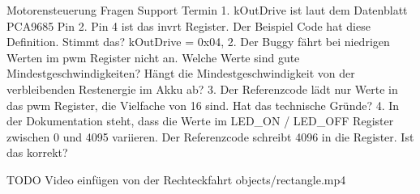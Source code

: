 \documentclass[12pt,twoside]{report}
\begin{document}
\begin{section}{Motorensteuerung}
Fragen Support Termin
1. kOutDrive ist laut dem Datenblatt PCA9685 Pin 2. Pin 4 ist das invrt Register. Der
Beispiel Code hat diese Definition. Stimmt das?
kOutDrive    = 0x04,
2. Der Buggy fährt bei niedrigen Werten im pwm Register nicht an. Welche Werte
sind gute Mindestgeschwindigkeiten? Hängt die Mindestgeschwindigkeit von der
verbleibenden Restenergie im Akku ab?
3. Der Referenzcode lädt nur Werte in das pwm Register, die Vielfache von 16
sind. Hat das technische Gründe?
4. In der Dokumentation steht, dass die Werte im LED_ON / LED_OFF Register
zwischen 0 und 4095 variieren. Der
Referenzcode schreibt 4096 in die Register. Ist das korrekt?

    TODO Video einfügen von der Rechteckfahrt objects/rectangle.mp4

\end{section}
\end{document}
